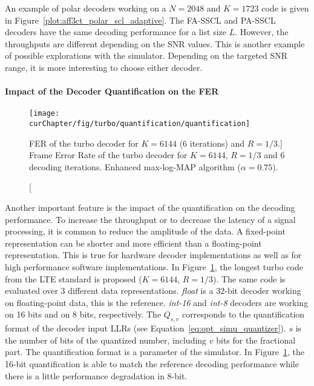 An example of polar decoders working on a $N = 2048$ and $K = 1723$ code is
given in Figure~\ref{plot:aff3ct_polar_scl_adaptive}. The FA-SSCL and PA-SSCL
decoders have the same decoding performance for a list size $L$. However,
the throughputs are different depending on the SNR values. This is another
example of possible explorations with the \AFFECT simulator. Depending on the
targeted SNR range, it is more interesting to choose either decoder.

\paragraph{Impact of the Decoder Quantification on the FER}

\begin{figure}[htp]
  \centering
  \texttt{[image: \\curChapter/fig/turbo/quantification/quantification]}
  \caption
    [FER of the turbo decoder for $K = 6144$ (6 iterations) and
     $R=1/3$.]
    {Frame Error Rate of the turbo decoder for $K = 6144$, $R=1/3$ and 6
     decoding iterations. Enhanced max-log-MAP algorithm ($\alpha = 0.75$).}
  \label{plot:aff3ct_turbo_quantification}
\end{figure}

Another important feature is the impact of the quantification on the decoding
performance. To increase the throughput or to decrease the latency of a signal
processing, it is common to reduce the amplitude of the data. A fixed-point
representation can be shorter and more efficient than a floating-point
representation. This is true for hardware decoder implementations as well as for
high performance software implementations. In
Figure~\ref{plot:aff3ct_turbo_quantification}, the longest turbo code from the
LTE standard is proposed ($K = 6144$, $R = 1/3$). The same code is evaluated
over 3 different data representations. \emph{float} is a 32-bit decoder working
on floating-point data, this is the reference. \emph{int-16} and \emph{int-8}
decoders are working on 16 bits and on 8 bits, respectively. The $Q_{s,v}$
corresponds to the quantification format of the decoder input LLRs (see
Equation~\ref{eq:opt_simu_quantizer}). $s$ is the number of bits of the
quantized number, including $v$ bits for the fractional part. The quantification
format is a parameter of the \AFFECT simulator. In
Figure~\ref{plot:aff3ct_turbo_quantification}, the 16-bit quantification is able
to match the reference decoding performance while there is a little performance
degradation in 8-bit.

